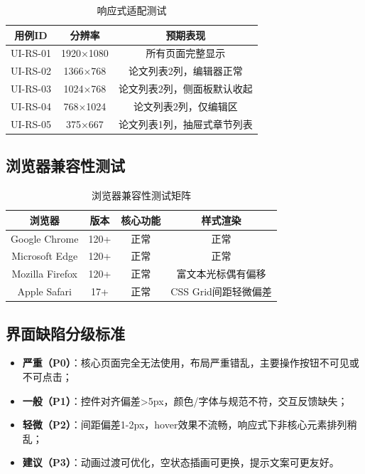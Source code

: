 \begin{table}[htbp]
    \centering
    \caption{响应式适配测试}
    \begin{tabular}{|c|c|c|}
        \hline
        \textbf{用例ID} & \textbf{分辨率} & \textbf{预期表现} \\
        \hline
        UI-RS-01 & 1920×1080 & 所有页面完整显示 \\
        \hline
        UI-RS-02 & 1366×768 & 论文列表2列，编辑器正常 \\
        \hline
        UI-RS-03 & 1024×768 & 论文列表2列，侧面板默认收起 \\
        \hline
        UI-RS-04 & 768×1024 & 论文列表2列，仅编辑区 \\
        \hline
        UI-RS-05 & 375×667 & 论文列表1列，抽屉式章节列表 \\
        \hline
    \end{tabular}
\end{table}

\subsection{浏览器兼容性测试}

\begin{table}[htbp]
    \centering
    \caption{浏览器兼容性测试矩阵}
    \begin{tabular}{|c|c|c|c|}
        \hline
        \textbf{浏览器} & \textbf{版本} & \textbf{核心功能} & \textbf{样式渲染} \\
        \hline
        Google Chrome & 120+ & 正常 & 正常 \\
        \hline
        Microsoft Edge & 120+ & 正常 & 正常 \\
        \hline
        Mozilla Firefox & 120+ & 正常 & 富文本光标偶有偏移 \\
        \hline
        Apple Safari & 17+ & 正常 & CSS Grid间距轻微偏差 \\
        \hline
    \end{tabular}
\end{table}

\subsection{界面缺陷分级标准}

\begin{itemize}
    \item \textbf{严重（P0）}：核心页面完全无法使用，布局严重错乱，主要操作按钮不可见或不可点击；
    \item \textbf{一般（P1）}：控件对齐偏差>5px，颜色/字体与规范不符，交互反馈缺失；
    \item \textbf{轻微（P2）}：间距偏差1-2px，hover效果不流畅，响应式下非核心元素排列稍乱；
    \item \textbf{建议（P3）}：动画过渡可优化，空状态插画可更换，提示文案可更友好。
\end{itemize}

